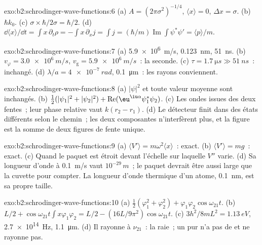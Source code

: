 \begin{solution}{exo:b2:schrodinger-wave-functions:6}
(a) $A = (2\pi\sigma^2)^{-1/4}$, $\langle x\rangle = 0$, $\Delta x = \sigma$. (b) $\hbar k_0$.
(c) $\sigma \times \hbar/2\sigma = \hbar/2$. (d) $\dd\langle x\rangle/\dd t = \int x\,
\partial_t\rho = -\int x\,\partial_xj = \int j = (\hbar/m)\operatorname{Im}\int\psi^*
\psi' = \langle p\rangle/m$.
\end{solution}

\begin{solution}{exo:b2:schrodinger-wave-functions:7}
(a) \qty{5.9e6}{m/s}, \qty{0.123}{nm}, \qty{51}{ns}. (b) $v_\varphi = \qty{3.0e6}{m/s}$,
$v_{\text{g}} = \qty{5.9e6}{m/s}$~: la seconde. (c) $\tau = \qty{1.7}{\micro s} \gg
\qty{51}{ns}$~: inchangé. (d) $\lambda/a = \qty{4e-7}{rad}$, \qty{0.1}{\micro m}~:
les rayons conviennent.
\end{solution}

\begin{solution}{exo:b2:schrodinger-wave-functions:8}
(a) $|\psi|^2$ et toute valeur moyenne sont inchangés. (b) $\tfrac12(|\psi_1|^2
+ |\psi_2|^2) + \operatorname{Re}(\eu^{\iu\alpha}\psi_1^*\psi_2)$. (c) Les ondes issues
des deux fentes~; leur phase relative vaut $k(r_2 - r_1)$. (d) Le détecteur
finit dans des états différents selon le chemin~; les deux composantes
n'interfèrent plus, et la figure est la somme de deux figures de fente
unique.
\end{solution}

\begin{solution}{exo:b2:schrodinger-wave-functions:9}
(a) $\langle V'\rangle = m\omega^2\langle x\rangle$~: exact. (b) $\langle V'\rangle
= mg$~: exact. (c) Quand le paquet est étroit devant l'échelle sur laquelle
$V''$ varie. (d) Sa longueur d'onde à \qty{0.1}{m/s} vaut $10^{-29}\,\unit{m}$~; le
paquet devrait être aussi large que la cuvette pour compter. La longueur d'onde
thermique d'un atome, \qty{0.1}{nm}, est sa propre taille.
\end{solution}

\begin{solution}{exo:b2:schrodinger-wave-functions:10}
(a) $\tfrac12(\varphi_1^2 + \varphi_2^2) + \varphi_1\varphi_2\cos\omega_{21}t$. (b) $L/2 +
\cos\omega_{21}t\int x\varphi_1\varphi_2 = L/2 - (16L/9\pi^2)\cos\omega_{21}t$. (c)
$3h^2/8mL^2 = \qty{1.13}{eV}$, \qty{2.7e14}{Hz}, \qty{1.1}{\micro m}. (d) Il rayonne
à $\nu_{21}$~: la raie~; un  pur n'a pas de  et ne rayonne pas.
\end{solution}

